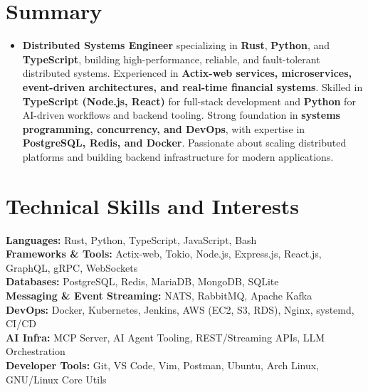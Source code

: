 \documentclass[a4paper,11pt]{article}
\newcommand{\resumeSubHeadingListStart}{\begin{itemize}[leftmargin=*,labelsep=0mm, itemsep=0mm, label={}]}
\newcommand{\resumeSubHeadingListEnd}{\end{itemize}\vspace{2mm}}
\begin{document}
\section{\textbf{Summary}}
 \resumeSubHeadingListStart
    \item{
        \textbf{Distributed Systems Engineer} specializing in \textbf{Rust}, \textbf{Python}, and \textbf{TypeScript}, building high-performance, reliable, and fault-tolerant distributed systems. Experienced in \textbf{Actix-web services, microservices, event-driven architectures, and real-time financial systems}. Skilled in \textbf{TypeScript (Node.js, React)} for full-stack development and \textbf{Python} for AI-driven workflows and backend tooling. Strong foundation in \textbf{systems programming, concurrency, and DevOps}, with expertise in \textbf{PostgreSQL, Redis, and Docker}. Passionate about scaling distributed platforms and building backend infrastructure for modern applications.
    }
 \resumeSubHeadingListEnd
\vspace{-16pt}

\section{\textbf{Technical Skills and Interests}}
 \begin{itemize}[leftmargin=0.05in, label={}]
    \small{\item{
    \textbf{Languages:} Rust, Python, TypeScript, JavaScript, Bash \\
    \textbf{Frameworks \& Tools:} Actix-web, Tokio, Node.js, Express.js, React.js, GraphQL, gRPC, WebSockets \\
    \textbf{Databases:} PostgreSQL, Redis, MariaDB, MongoDB, SQLite \\
    \textbf{Messaging \& Event Streaming:} NATS, RabbitMQ, Apache Kafka \\
    \textbf{DevOps:} Docker, Kubernetes, Jenkins, AWS (EC2, S3, RDS), Nginx, systemd, CI/CD \\
    \textbf{AI Infra:} MCP Server, AI Agent Tooling, REST/Streaming APIs, LLM Orchestration \\
    \textbf{Developer Tools:} Git, VS Code, Vim, Postman, Ubuntu, Arch Linux, GNU/Linux Core Utils \\
    }}
 \end{itemize}
 \vspace{-16pt}
 
\end{document}
